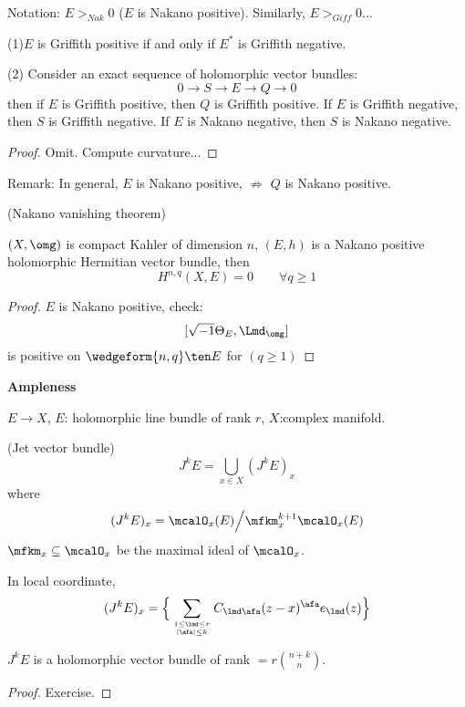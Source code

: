 Notation: $E>_{Nak}0$ ($E$ is Nakano positive).
Similarly, $E>_{Giff}0$...

\begin{prop}

(1)$E$ is Griffith positive if and only if $E^*$ is Griffith negative.

(2) Consider an exact sequence of holomorphic vector bundles:
$$0\to S\to E\to Q\to 0$$
then if $E$ is Griffith positive, then $Q$ is Griffith positive.
If $E$ is Griffith negative, then $S$ is Griffith negative.
If $E$ is Nakano negative, then $S$ is Nakano negative.
\end{prop}

\begin{proof}
Omit. Compute curvature...
\end{proof}

Remark: In general, $E$ is Nakano positive, $\not\Rightarrow$
$Q$ is Nakano positive.

\begin{thm}(Nakano vanishing theorem)

$(X,\omg)$ is compact Kahler of dimension $n$,
$(E,h)$ is a Nakano positive holomorphic Hermitian vector bundle, then
$$H^{n,q}(X,E)=0\qquad \forall q\geq 1$$
\end{thm}

\begin{proof}
$E$ is Nakano positive, check:
$$[\sqrt{-1}\Theta_E,\Lmd_\omg]$$
is positive on $\wedgeform{n,q}\ten E$ for $(q\geq 1)$
\end{proof}

\textbf{Ampleness}

$E\to X$, $E$: holomorphic line bundle of rank $r$, 
$X$:complex manifold.

\begin{definition}(Jet vector bundle)
$$J^kE=\bigcup_{x\in X}(J^kE)_x$$
where 
$$(J^kE)_x=\mcalO_x(E)\Big/\mfkm_x^{k+1}\mcalO_x(E)$$
$\mfkm_x\subseteq\mcalO_x$ be the maximal ideal of $\mcalO_x$.
\end{definition}

In local coordinate, 
$$
  (J^kE)_x
=
  \Big\{
    \sum_{1\leq\lmd\leq r \atop |\afa|\leq k}
      C_{\lmd\afa}(z-x)^{\afa} e_{\lmd}(z)
  \Big\}         
$$

\begin{prop}
$J^kE$ is a holomorphic vector bundle of rank $=r{n+k\choose n}$.
\end{prop}

\begin{proof}
  Exercise.
\end{proof}

